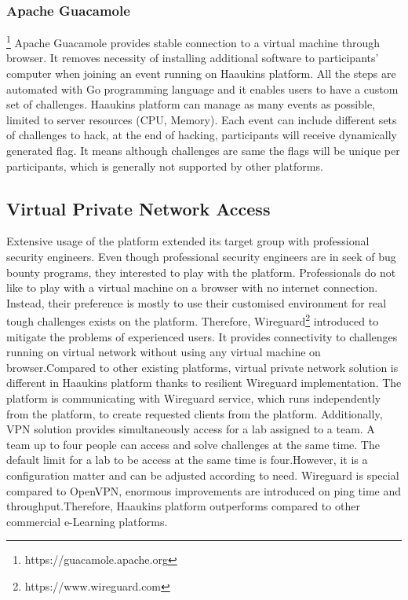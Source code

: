 \subsubsection{Apache Guacamole}\footnote{https://guacamole.apache.org}
Apache Guacamole provides stable connection to a virtual machine through browser. It removes necessity of installing additional software to participants' computer when joining an event running on Haaukins platform. 
All the steps are automated with Go programming language and it enables users to have a custom set of challenges. Haaukins platform can manage as many events as possible, limited to server resources (CPU, Memory). Each event can include different sets of challenges to hack, at the end of hacking, participants will receive dynamically generated flag. It means although challenges are same the flags will be unique per participants, which is generally not supported by other platforms. 



\subsection{Virtual Private Network Access}
Extensive usage of the platform extended its target group with professional security engineers. Even though professional security engineers are in seek of bug bounty programs, they interested to play with the platform. Professionals do not like to play with a virtual machine on a browser with no internet connection. Instead, their preference is mostly to use their customised environment for real tough challenges exists on the platform. Therefore, Wireguard\footnote{https://www.wireguard.com} introduced to mitigate the problems of experienced users. It provides connectivity to challenges running on virtual network without using any virtual machine on browser.Compared to other existing platforms, virtual private network solution is different in Haaukins platform thanks to resilient Wireguard implementation. The platform is communicating with Wireguard service, which runs independently from the platform, to create requested clients from the platform. 
Additionally, VPN solution provides simultaneously access for a lab assigned to a team. A team up to four people can access and solve challenges at the same time. The default limit for a lab to be access at the same time is four.However, it is a configuration matter and can be adjusted according to need. 
Wireguard is special compared to OpenVPN, enormous improvements are introduced on ping time and throughput\cite{wireguard}.Therefore, Haaukins platform outperforms compared to other commercial e-Learning platforms. 









